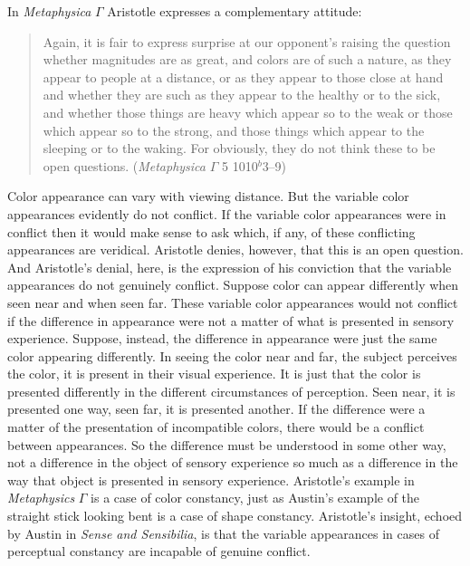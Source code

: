 In \emph{Metaphysica} \( \Gamma \) Aristotle expresses a complementary attitude:
\begin{quote}
	Again, it is fair to express surprise at our opponent's raising the question whether magnitudes are as great, and colors are of such a nature, as they appear to people at a distance, or as they appear to those close at hand and whether they are such as they appear to the healthy or to the sick, and whether those things are heavy which appear so to the weak or those which appear so to the strong, and those things which appear to the sleeping or to the waking. For obviously, they do not think these to be open questions. (\emph{Metaphysica} \( \Gamma \) 5 1010\( ^{b} \)3--9)
\end{quote}
Color appearance can vary with viewing distance. But the variable color appearances evidently do not conflict. If the variable color appearances were in conflict then it would make sense to ask which, if any, of these conflicting appearances are veridical. Aristotle denies, however, that this is an open question. And Aristotle's denial, here, is the expression of his conviction that the variable appearances do not genuinely conflict. Suppose color can appear differently when seen near and when seen far. These variable color appearances would not conflict if the difference in appearance were not a matter of what is presented in sensory experience. Suppose, instead, the difference in appearance were just the same color appearing differently. In seeing the color near and far, the subject perceives the color, it is present in their visual experience. It is just that the color is presented differently in the different circumstances of perception. Seen near, it is presented one way, seen far, it is presented another. If the difference were a matter of the presentation of incompatible colors, there would be a conflict between appearances. So the difference must be understood in some other way, not a difference in the object of sensory experience so much as a difference in the way that object is presented in sensory experience. Aristotle's example in \emph{Metaphysics} \( \Gamma \) is a case of color constancy, just as Austin's \citeyearpar{Austin:1962lr} example of the straight stick looking bent is a case of shape constancy. Aristotle's insight, echoed by Austin in \emph{Sense and Sensibilia}, is that the variable appearances in cases of perceptual constancy are incapable of genuine conflict. 

